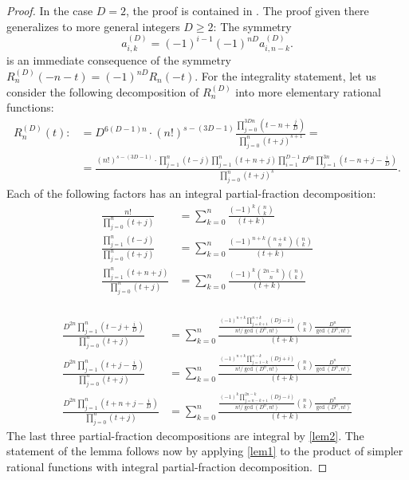 \documentclass[11pt]{amsart}
\theoremstyle{plain}
\theoremstyle{remark}
\theoremstyle{definition}
\begin{document}
\begin{proof}
	In the case $D=2$, the proof is contained in \cite{zudilin}. The proof given there generalizes to more general integers $D\geq 2$: The symmetry
	\[
		a_{i,k}^{(D)}=(-1)^{i-1}(-1)^{nD}a_{i,n-k}^{(D)}.
	\]
	is an immediate consequence of the symmetry $R_n^{(D)}(-n-t)=(-1)^{nD}R_n(-t)$. For the integrality statement, let us consider the following decomposition of $R^{(D)}_n$ into more elementary rational functions:
	\begin{align*}
		R_n^{(D)}(t):&=D^{6(D-1)n}\cdot (n!)^{s-(3D-1)}\frac{\prod_{j=0}^{3Dn}(t-n+\frac{j}{D})}{\prod_{j=0}^n(t+j)^{s+1}}=\\
		&=\frac{(n!)^{s-(3D-1)}\cdot \prod_{j=1}^n(t-j)\prod_{j=1}^n(t+n+j)\prod_{i=1}^{D-1}D^{6n}\prod_{j=1}^{3n}(t-n+j-\frac{i}{D})}{\prod_{j=0}^n(t+j)^{s}}.
	\end{align*}
	Each of the following factors has an integral partial-fraction decomposition:
	\begin{align*}
			\frac{n!}{\prod_{j=0}^n(t+j)}&=\sum_{k=0}^n\frac{(-1)^k\binom{n}{k}}{(t+k)}\\
			\frac{\prod_{j=1}^n(t-j)}{\prod_{j=0}^n(t+j)}&=\sum_{k=0}^n\frac{(-1)^{n+k}\binom{n+k}{n}\binom{n}{k}}{(t+k)}\\
			\frac{\prod_{j=1}^n(t+n+j)}{\prod_{j=0}^n(t+j)}&=\sum_{k=0}^n\frac{(-1)^k\binom{2n-k}{n}\binom{n}{k}}{(t+k)}\\
	\end{align*}

	\begin{align*}
		\frac{D^{2n}\prod_{j=1}^n(t-j+\frac{i}{D})}{\prod_{j=0}^n(t+j)}&=\sum_{k=0}^n\frac{\frac{(-1)^{n+k}\prod_{j=k+1}^{n+k}(Dj-i)}{n!/\gcd(D^n,n!)}\binom{n}{k}\frac{D^n}{\gcd(D^n,n!)}}{(t+k)}\\
		\frac{D^{2n}\prod_{j=1}^n(t+j-\frac{i}{D})}{\prod_{j=0}^n(t+j)}&=\sum_{k=0}^n\frac{\frac{(-1)^{n+k}\prod_{j=1-k}^{n-k}(Dj+i)}{n!/\gcd(D^n,n!)}\binom{n}{k}\frac{D^n}{\gcd(D^n,n!)}}{(t+k)}\\
		\frac{D^{2n}\prod_{j=1}^n(t+n+j-\frac{i}{D})}{\prod_{j=0}^n(t+j)}&=\sum_{k=0}^n\frac{\frac{(-1)^{k}\prod_{j=n-k+1}^{2n-k}(Dj-i)}{n!/\gcd(D^n,n!)}\binom{n}{k}\frac{D^n}{\gcd(D^n,n!)}}{(t+k)}
	\end{align*}
The last three partial-fraction decompositions are integral by \cref{lem2}. The statement of the lemma follows now by applying \cref{lem1} to the product of simpler rational functions with integral partial-fraction decomposition.
\end{proof}
\end{document}
